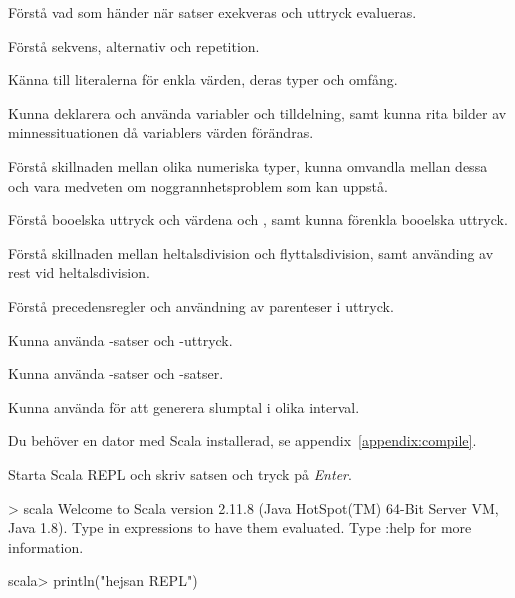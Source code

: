 
\Exercise{\ExeWeekONE}\label{exe:W01}

\begin{Goals}
\item Förstå vad som händer när satser exekveras och uttryck evalueras.
\item Förstå sekvens, alternativ och repetition.
\item Känna till literalerna för enkla värden, deras typer och omfång.
\item Kunna deklarera och använda variabler och tilldelning, samt kunna rita bilder av minnessituationen då variablers värden förändras.
\item Förstå skillnaden mellan olika numeriska typer, kunna omvandla mellan dessa och vara medveten om noggrannhetsproblem som kan uppstå.
\item Förstå booelska uttryck och värdena  och , samt kunna förenkla booelska uttryck.
\item Förstå skillnaden mellan heltalsdivision och flyttalsdivision, samt använding av rest vid heltalsdivision.
\item Förstå precedensregler och användning av parenteser i uttryck.
\item Kunna använda -satser och -uttryck.
\item Kunna använda -satser och -satser.
\item Kunna använda  för att generera slumptal i olika interval.
\end{Goals}

\begin{Preparations}
\item {}
\item Du behöver en dator med Scala installerad, se appendix~\ref{appendix:compile}.
\end{Preparations}

\BasicTasks

\Task Starta Scala REPL  och skriv satsen  och tryck på \textit{Enter}. %

\begin{REPLnonum}
> scala
Welcome to Scala version 2.11.8 (Java HotSpot(TM) 64-Bit Server VM, Java 1.8).
Type in expressions to have them evaluated.
Type :help for more information.

scala> println("hejsan REPL")
\end{REPLnonum}

